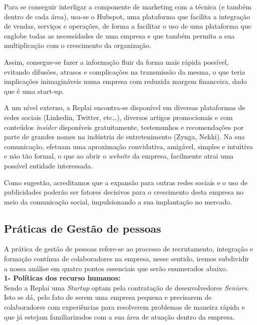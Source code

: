 Para se conseguir interligar a componente de marketing com a técnica (e também dentro de cada área), usa-se o Hubspot, uma plataforma que facilita a integração de vendas, serviços e operações, de forma a facilitar o uso de uma plataforma que englobe todas as necessidades de uma empresa e que também permita a sua multiplicação com o crescimento da organização.

Assim, consegue-se fazer a informação fluir da forma mais rápida possível, evitando difusões, atrasos e complicações na transmissão da mesma, o que teria implicações inimagináveis numa empresa com reduzida margem financeira, dado que é uma start-up.

A um nível externo, a Replai encontra-se disponível em diversas plataformas de redes sociais (Linkedin, Twitter, etc…), diversos artigos promocionais e com conteúdos \textit{insider} disponíveis gratuitamente, testemunhos e recomendações por parte de grandes nomes na indústria de entretenimento (Zynga, Nekki). Na sua comunicação, efetuam uma aproximação convidativa, amigável, simples e intuitiva e não tão formal, o que ao abrir o \textit{website} da empresa, facilmente atrai uma possível entidade interessada. 

Como sugestão, acreditamos que a expansão para outras redes sociais e o uso de publicidades poderão ser fatores decisivos para o crescimento desta empresa no meio da comunicação social, impulsionando a sua implantação no mercado.

\subsection{Práticas de Gestão de pessoas}
A prática de gestão de pessoas refere-se ao processo de recrutamento, integração e formação contínua de colaboradores na empresa, nesse sentido, iremos subdividir a nossa análise em quatro pontos essenciais que serão enumerados abaixo.\\

\noindent \textbf{1- Políticas dos recurso humanos:}\\
Sendo a Replai uma \textit{Startup} optam pela contratação de 
desenvolvedores \textit{Seniors}. Isto se dá, pelo fato de serem uma empresa pequena e precisarem de colaboradores com experiências para resolverem problemas de maneira rápida e que já estejam familiarizados com a sua área de atuação dentro da empresa.\\


